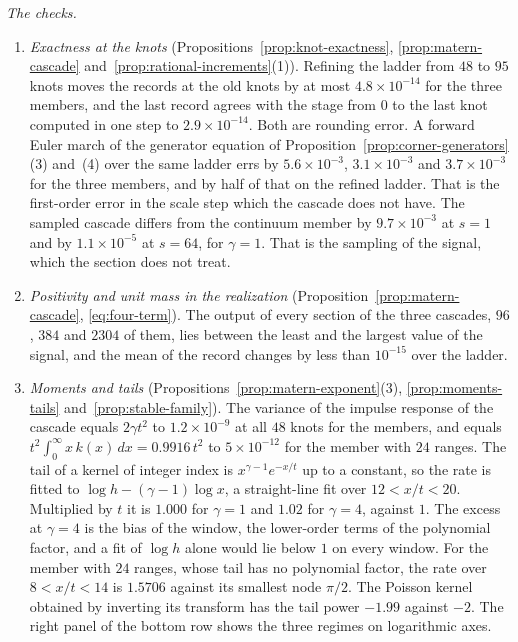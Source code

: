 \begin{example}
\emph{The checks.}
\begin{enumerate}
\item \emph{Exactness at the knots} (Propositions~\ref{prop:knot-exactness},
\ref{prop:matern-cascade} and~\ref{prop:rational-increments}(1)). Refining the ladder from
$48$ to $95$ knots moves the records at the old knots by at most $4.8 \times 10^{-14}$ for the
three members, and the last record agrees with the stage from $0$ to the last knot computed in
one step to $2.9 \times 10^{-14}$. Both are rounding error. A forward Euler march of the
generator equation of Proposition~\ref{prop:corner-generators}(3) and~(4) over the same ladder
errs by $5.6 \times 10^{-3}$, $3.1 \times 10^{-3}$ and $3.7 \times 10^{-3}$ for the three
members, and by half of that on the refined ladder. That is the first-order error in the scale
step which the cascade does not have. The sampled cascade differs from the continuum member
by $9.7 \times 10^{-3}$ at $s = 1$ and by $1.1 \times 10^{-5}$ at $s = 64$, for
$\gamma = 1$. That is the sampling of the signal, which the section does not treat.
\item \emph{Positivity and unit mass in the realization}
(Proposition~\ref{prop:matern-cascade}, \ref{eq:four-term}). The output of every section of
the three cascades, $96$, $384$ and $2304$ of them, lies between the least and the largest
value of the signal, and the mean of the record changes by less than $10^{-15}$ over the
ladder.
\item \emph{Moments and tails} (Propositions~\ref{prop:matern-exponent}(3),
\ref{prop:moments-tails} and~\ref{prop:stable-family}). The variance of the impulse response
of the cascade equals $2\gamma t^2$ to $1.2 \times 10^{-9}$ at all $48$ knots for the
\Matern{} members, and equals $t^2\int_0^\infty x\,k(x)\,dx = 0.9916\,t^2$ to
$5 \times 10^{-12}$ for the member with $24$ ranges. The tail of a \Matern{} kernel of integer
index is $x^{\gamma-1}e^{-x/t}$ up to a constant, so the rate is fitted to
$\log h - (\gamma - 1)\log x$, a straight-line fit over $12 < x/t < 20$. Multiplied by $t$ it
is $1.000$ for $\gamma = 1$ and $1.02$ for $\gamma = 4$, against $1$. The excess at
$\gamma = 4$ is the bias of the window, the lower-order terms of the polynomial factor, and a
fit of $\log h$ alone would lie below $1$ on every window. For the member with $24$ ranges,
whose tail has no polynomial factor, the rate over $8 < x/t < 14$ is $1.5706$ against its
smallest node $\pi/2$. The Poisson
kernel obtained by inverting its transform has the tail power $-1.99$ against $-2$. The
right panel of the bottom row shows the three regimes on logarithmic axes.

\end{enumerate}
\end{example}
